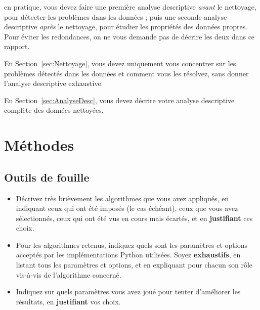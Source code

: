 \documentclass{ceri/sty/rapport}
\begin{document}
\begin{beware}[Remarque]
en pratique, vous devez faire une première analyse descriptive \textit{avant} le nettoyage, pour détecter les problèmes dans les données ; puis une seconde analyse descriptive \textit{après} le nettoyage, pour étudier les propriétés des données propres. Pour éviter les redondances, on ne vous demande pas de décrire les deux dans ce rapport.

En Section~\ref{sec:Nettoyage}, vous devez uniquement vous concentrer sur les problèmes détectés dans les données et comment vous les résolvez, sans donner l'analyse descriptive exhaustive.

En Section~\ref{sec:AnalyseDesc}, vous devez décrire votre analyse descriptive complète des données nettoyées.
\end{beware}


















\section{Méthodes}

\subsection{Outils de fouille}
\begin{itemize}
	\item Décrivez très brièvement les algorithmes que vous avez appliqués, en indiquant ceux qui ont été imposés (le cas échéant), ceux que vous avez sélectionnés, ceux qui ont été vus en cours mais écartés, et en \textbf{justifiant} ces choix.
	\item Pour les algorithmes retenus, indiquez quels sont les paramètres et options acceptés par les implémentations Python utilisées. Soyez \textbf{exhaustifs}, en listant tous les paramètres et options, et en expliquant pour chacun son rôle vis-à-vis de l'algorithme concerné.
      \item Indiquez sur quels paramètres vous avez joué pour tenter d'améliorer les résultats, en \textbf{justifiant} vos choix. 
\end{itemize}
\end{document}
